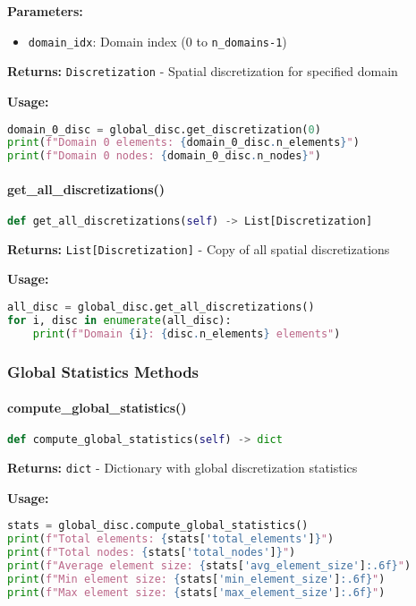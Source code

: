 \textbf{Parameters:}
\begin{itemize}
    \item \texttt{domain\_idx}: Domain index (0 to \texttt{n\_domains-1})
\end{itemize}

\textbf{Returns:} \texttt{Discretization} - Spatial discretization for specified domain

\textbf{Usage:}
\begin{lstlisting}[language=Python, caption=Get Discretization Usage]
domain_0_disc = global_disc.get_discretization(0)
print(f"Domain 0 elements: {domain_0_disc.n_elements}")
print(f"Domain 0 nodes: {domain_0_disc.n_nodes}")
\end{lstlisting}

\paragraph{get\_all\_discretizations()}
\begin{lstlisting}[language=Python, caption=Get All Discretizations Method]
def get_all_discretizations(self) -> List[Discretization]
\end{lstlisting}

\textbf{Returns:} \texttt{List[Discretization]} - Copy of all spatial discretizations

\textbf{Usage:}
\begin{lstlisting}[language=Python, caption=Get All Discretizations Usage]
all_disc = global_disc.get_all_discretizations()
for i, disc in enumerate(all_disc):
    print(f"Domain {i}: {disc.n_elements} elements")
\end{lstlisting}

\subsubsection{Global Statistics Methods}

\paragraph{compute\_global\_statistics()}
\begin{lstlisting}[language=Python, caption=Compute Global Statistics Method]
def compute_global_statistics(self) -> dict
\end{lstlisting}

\textbf{Returns:} \texttt{dict} - Dictionary with global discretization statistics

\textbf{Usage:}
\begin{lstlisting}[language=Python, caption=Global Statistics Usage]
stats = global_disc.compute_global_statistics()
print(f"Total elements: {stats['total_elements']}")
print(f"Total nodes: {stats['total_nodes']}")
print(f"Average element size: {stats['avg_element_size']:.6f}")
print(f"Min element size: {stats['min_element_size']:.6f}")
print(f"Max element size: {stats['max_element_size']:.6f}")
\end{lstlisting}

